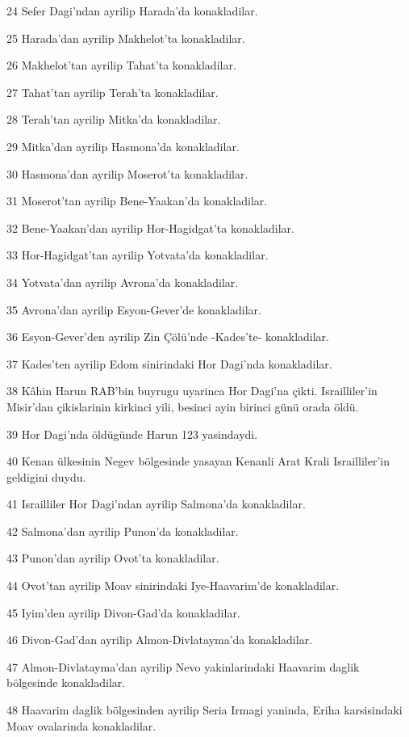 \par 24 Sefer Dagi'ndan ayrilip Harada'da konakladilar.
\par 25 Harada'dan ayrilip Makhelot'ta konakladilar.
\par 26 Makhelot'tan ayrilip Tahat'ta konakladilar.
\par 27 Tahat'tan ayrilip Terah'ta konakladilar.
\par 28 Terah'tan ayrilip Mitka'da konakladilar.
\par 29 Mitka'dan ayrilip Hasmona'da konakladilar.
\par 30 Hasmona'dan ayrilip Moserot'ta konakladilar.
\par 31 Moserot'tan ayrilip Bene-Yaakan'da konakladilar.
\par 32 Bene-Yaakan'dan ayrilip Hor-Hagidgat'ta konakladilar.
\par 33 Hor-Hagidgat'tan ayrilip Yotvata'da konakladilar.
\par 34 Yotvata'dan ayrilip Avrona'da konakladilar.
\par 35 Avrona'dan ayrilip Esyon-Gever'de konakladilar.
\par 36 Esyon-Gever'den ayrilip Zin Çölü'nde -Kades'te- konakladilar.
\par 37 Kades'ten ayrilip Edom sinirindaki Hor Dagi'nda konakladilar.
\par 38 Kâhin Harun RAB'bin buyrugu uyarinca Hor Dagi'na çikti. Israilliler'in Misir'dan çikislarinin kirkinci yili, besinci ayin birinci günü orada öldü.
\par 39 Hor Dagi'nda öldügünde Harun 123 yasindaydi.
\par 40 Kenan ülkesinin Negev bölgesinde yasayan Kenanli Arat Krali Israilliler'in geldigini duydu.
\par 41 Israilliler Hor Dagi'ndan ayrilip Salmona'da konakladilar.
\par 42 Salmona'dan ayrilip Punon'da konakladilar.
\par 43 Punon'dan ayrilip Ovot'ta konakladilar.
\par 44 Ovot'tan ayrilip Moav sinirindaki Iye-Haavarim'de konakladilar.
\par 45 Iyim'den ayrilip Divon-Gad'da konakladilar.
\par 46 Divon-Gad'dan ayrilip Almon-Divlatayma'da konakladilar.
\par 47 Almon-Divlatayma'dan ayrilip Nevo yakinlarindaki Haavarim daglik bölgesinde konakladilar.
\par 48 Haavarim daglik bölgesinden ayrilip Seria Irmagi yaninda, Eriha karsisindaki Moav ovalarinda konakladilar.
